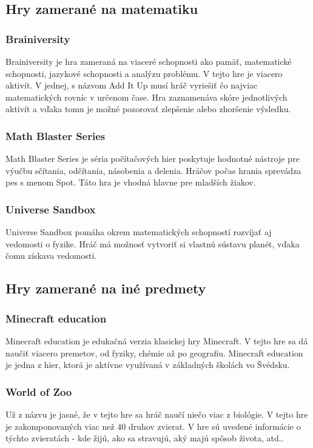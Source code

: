 \documentclass[10pt,twoside,slovak,a4paper]{article}
\begin{document}
\subsection{Hry zamerané na matematiku}\label{edukacnehry:hrymat} 
\subsubsection{Brainiversity}
Brainiversity je hra zameraná na viaceré schopnosti ako pamäť, matematické schopnosti, jazykové schopnosti a analýzu problému.
V tejto hre je viacero aktivít. V jednej, s názvom Add It Up musí hráč vyriešiť čo najviac matematických rovníc v určenom čase.
Hra zaznamenáva skóre jednotlivých aktivít a vďaka tomu je možné pozorovať zlepšenie alebo zhoršenie výsledku.
\subsubsection{Math Blaster Series}
Math Blaster Series je séria počítačových hier poskytuje hodnotné nástroje pre výučbu sčítania, odčítania, násobenia a delenia. Hráčov počas hrania sprevádza pes s menom Spot.
Táto hra je vhodná hlavne pre mladších žiakov.
\subsubsection{Universe Sandbox}
Universe Sandbox pomáha okrem matematických schopností rozvíjať aj vedomosti o fyzike.
Hráč má možnosť vytvoriť si vlastnú sústavu planét, vďaka čomu získava vedomosti.
\subsection{Hry zamerané na iné predmety}\label{edukacnehry:hryine}
\subsubsection{Minecraft education}\label{edukacnehry:hryine:mc}
Minecraft education je edukačná verzia klasickej hry Minecraft. 
V tejto hre sa dá naučiť viacero premetov, od fyziky, chémie až po geografiu.
Minecraft education je jedna z hier, ktorá je aktívne využívaná v základných školách vo Švédsku.
\subsubsection{World of Zoo}
Už z názvu je jasné, že v tejto hre sa hráč naučí niečo viac z biológie. 
V tejto hre je zakomponovaných viac než 40 druhov zvierat. V hre sú uvedené informácie o týchto zvieratách - kde žijú, ako sa stravujú, aký majú spôsob života, atd..
\end{document}
